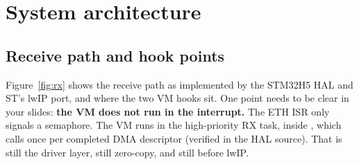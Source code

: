 \documentclass[10pt,a4paper]{article}
\begin{document}
\section{System architecture}
\subsection{Receive path and hook points}
Figure~\ref{fig:rx} shows the receive path as implemented by the STM32H5 HAL and ST's lwIP port, and where the two VM hooks sit. One point needs to be clear in your slides: \textbf{the VM does not run in the interrupt.} The ETH ISR only signals a semaphore. The VM runs in the high-priority RX task, inside , which  calls once per completed DMA descriptor (verified in the HAL source). That is still the driver layer, still zero-copy, and still before lwIP.
\end{document}
